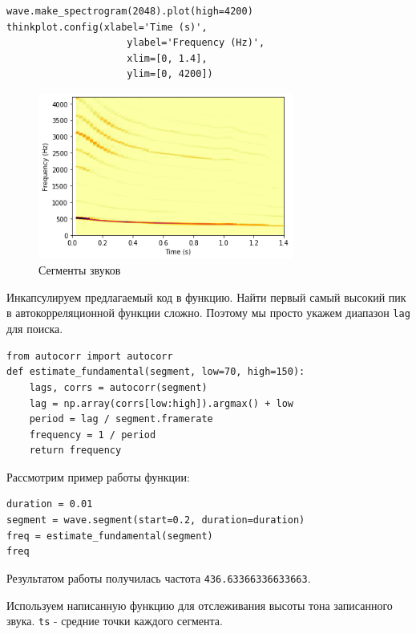 \documentclass[a4paper,12pt]{report}
\begin{document}
\begin{lstlisting}[caption=Спектрограмма звука]
wave.make_spectrogram(2048).plot(high=4200)
thinkplot.config(xlabel='Time (s)', 
                     ylabel='Frequency (Hz)',
                     xlim=[0, 1.4],
                     ylim=[0, 4200])
\end{lstlisting}

\begin{figure}[H]
        \centering
        \includegraphics[width=0.75\textwidth]{lab5_fig2_1.png}
        \caption{Сегменты звуков}
        \label{fig:lab5_fig2_1}
\end{figure}

Инкапсулируем предлагаемый код в функцию. Найти первый самый высокий пик в автокорреляционной функции сложно. Поэтому мы просто укажем диапазон \texttt{lag} для поиска.

\begin{lstlisting}[caption=Инкапсуляция функции]
from autocorr import autocorr
def estimate_fundamental(segment, low=70, high=150):
    lags, corrs = autocorr(segment)
    lag = np.array(corrs[low:high]).argmax() + low
    period = lag / segment.framerate
    frequency = 1 / period
    return frequency
\end{lstlisting}

Рассмотрим пример работы функции:

\begin{lstlisting}[caption=Пример работы функции]
duration = 0.01
segment = wave.segment(start=0.2, duration=duration)
freq = estimate_fundamental(segment)
freq
\end{lstlisting}

Результатом работы получилась частота \texttt{436.63366336633663}.

Используем написанную функцию для отслеживания высоты тона записанного звука. \texttt{ts} - средние точки каждого сегмента.
\end{document}
